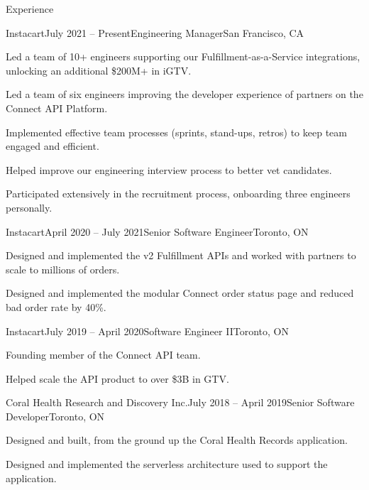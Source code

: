 \documentclass{resume} %
\begin{document}
\begin{rSection}{Experience}

\begin{rSubsection}{Instacart}{July 2021 -- Present}{Engineering Manager}{San Francisco, CA}
\item Led a team of 10+ engineers supporting our Fulfillment-as-a-Service integrations, unlocking an additional \$200M+ in iGTV.
\item Led a team of six engineers improving the developer experience of partners on the Connect API Platform.
\item Implemented effective team processes (sprints, stand-ups, retros) to keep team engaged and efficient.
\item Helped improve our engineering interview process to better vet candidates.
\item Participated extensively in the recruitment process, onboarding three engineers personally.
\end{rSubsection}


\begin{rSubsection}{Instacart}{April 2020 -- July 2021}{Senior Software Engineer}{Toronto, ON}
\item Designed and implemented the v2 Fulfillment APIs and worked with partners to scale to millions of orders.
\item Designed and implemented the modular Connect order status page and reduced bad order rate by 40\%.
\end{rSubsection}


\begin{rSubsection}{Instacart}{July 2019 -- April 2020}{Software Engineer II}{Toronto, ON}
\item Founding member of the Connect API team.
\item Helped scale the API product to over \$3B in GTV.
\end{rSubsection}


\begin{rSubsection}{Coral Health Research and Discovery Inc.}{July 2018 -- April 2019}{Senior Software Developer}{Toronto, ON}
\item Designed and built, from the ground up the Coral Health Records application.
\item Designed and implemented the serverless architecture used to support the application.
\end{rSubsection}


\end{rSection}
\end{document}

